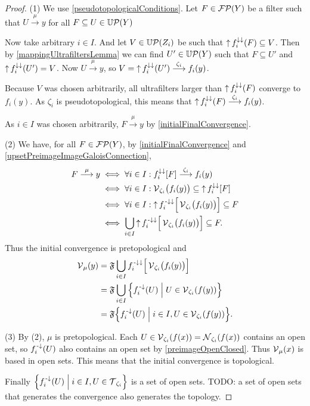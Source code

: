\begin{proof}
(1) We use \ref{pseudotopologicalConditions}. Let $F\in\operatorname{\mathcal{FP}}(Y)$ be a filter such that $U\overset{\mu}{\longrightarrow} y$ for all $F\subseteq U\in\operatorname{\mathbb{U}\mathcal{P}}(Y)$ 

Now take arbitrary $i\in I$. And let $V\in\operatorname{\mathbb{U}\mathcal{P}}(Z_i)$ be such that $\operatorname{\uparrow} f_i^{\downarrow\downarrow}(F) \subseteq V$. Then by \ref{mappingUltrafiltersLemma} we can find $U'\in\operatorname{\mathbb{U}\mathcal{P}}(Y)$ such that $F\subseteq U'$ and $\operatorname{\uparrow} f_i^{\downarrow\downarrow}(U') = V$. Now $U\overset{\mu}{\longrightarrow} y$, so $V = \operatorname{\uparrow} f_i^{\downarrow\downarrow}(U') \overset{\zeta_i}{\longrightarrow} f_i(y)$. 

Because $V$ was chosen arbitrarily, all ultrafilters larger than $\operatorname{\uparrow} f_i^{\downarrow\downarrow}(F)$ converge to $f_i(y)$. As $\zeta_i$ is pseudotopological, this means that $\operatorname{\uparrow} f_i^{\downarrow\downarrow}(F) \overset{\zeta_i}{\longrightarrow} f_i(y)$.

As $i\in I$ was chosen arbitrarily, $F\overset{\mu}{\longrightarrow} y$ by \ref{initialFinalConvergence}.

(2) We have, for all $F\in \operatorname{\mathcal{FP}}(Y)$, by \ref{initialFinalConvergence} and \ref{upsetPreimageImageGaloisConnection},
\begin{align*}
F \overset{\mu}{\longrightarrow} y &\iff \forall i\in I: f_i^{\downarrow\downarrow}[F] \overset{\zeta_i}{\longrightarrow} f_i(y) \\
&\iff \forall i\in I: \operatorname{\mathcal{V}}_{\zeta_i}\!\big(f_i(y)\big) \subseteq \operatorname{\uparrow} f_i^{\downarrow\downarrow}[F] \\
&\iff \forall i\in I: \operatorname{\uparrow} f_i^{{\text{\hspace{0.15em}-}\downarrow}\downarrow}\Big[\operatorname{\mathcal{V}}_{\zeta_i}\!\big(f_i(y)\big)\Big] \subseteq F \\
&\iff \bigcup_{i\in I} \operatorname{\uparrow} f_i^{{\text{\hspace{0.15em}-}\downarrow}\downarrow}\Big[\operatorname{\mathcal{V}}_{\zeta_i}\!\big(f_i(y)\big)\Big] \subseteq F.
\end{align*}
Thus the initial convergence is pretopological and
\begin{align*}
\vicinity_\mu(y) &= \mathfrak{F}\bigcup_{i\in I} f_i^{\preimf\imf}\Big[\vicinity_{\zeta_i}\!\big(f_i(y)\big)\Big] \\
&= \mathfrak{F}\bigcup_{i\in I}\setbuilder{f_i^\preimf(U)}{U\in \vicinity_{\zeta_i}(f(y))} \\
&= \mathfrak{F}\setbuilder{f_i^\preimf(U)}{i\in I, U\in \vicinity_{\zeta_i}(f(y))}.
\end{align*}

(3) By (2), $\mu$ is pretopological. Each $U\in \operatorname{\mathcal{V}}_{\zeta_i}(f(x)) = \operatorname{\mathcal{N}}_{\zeta_i}(f(x))$ contains an open set, so $f_i^{\text{\hspace{0.15em}-}\downarrow}(U)$ also contains an open set by \ref{preimageOpenClosed}. Thus $\operatorname{\mathcal{V}}_\mu(x)$ is based in open sets. This means that the initial convergence is topological.

Finally $\setbuilder{f_i^\preimf(U)}{i\in I, U\in \topology_{\zeta_i}}$ is a set of open sets. TODO: a set of open sets that generates the convergence also generates the topology.
\end{proof}


